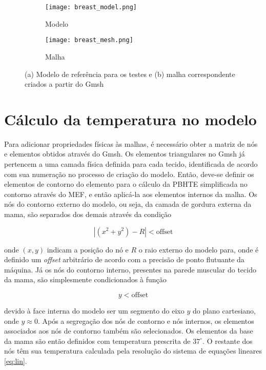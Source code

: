 \begin{figure}[!ht]
\centering
    \begin{subfigure}[b]{0.9\textwidth}
    \centering
    \texttt{[image: breast\_model.png]}
    \caption{Modelo}
    \end{subfigure}
    
    \begin{subfigure}[b]{0.9\textwidth}
    \centering
    \texttt{[image: breast\_mesh.png]}
    \caption{Malha}
    \end{subfigure}
    \caption{(a) Modelo de referência para os testes e (b) malha correspondente criados a partir do Gmsh}\label{fig:model}
\end{figure}

\section{Cálculo da temperatura no modelo}
Para adicionar propriedades físicas às malhas, é necessário obter a matriz de nós e elementos obtidos através do Gmsh. Os elementos triangulares no Gmsh já pertencem a uma camada física definida para cada tecido, identificada de acordo com sua numeração no processo de criação do modelo. Então, deve-se definir os elementos de contorno do elemento para o cálculo da PBHTE simplificada no contorno através do MEF, e então aplicá-la aos elementos internos da malha. Os nós do contorno externo do modelo, ou seja, da camada de gordura externa da mama, são separados dos demais através da condição

\begin{equation}
|(x^2 + y^2) - R| < \textrm{offset}
\end{equation}

\noindent onde $(x, y)$ indicam a posição do nó e $R$ o raio externo do modelo para, onde é definido um \textit{offset} arbitrário de acordo com a precisão de ponto flutuante da máquina. Já os nós do contorno interno, presentes na parede muscular do tecido da mama, são simplesmente condicionados à função

\begin{equation}
y < \textrm{offset}
\end{equation}

\noindent devido à face interna do modelo ser um segmento do eixo $y$ do plano cartesiano, onde $y \approx 0$. Após a segregação dos nós de contorno e nós internos, os elementos associados aos nós de contorno também são selecionados. Os elementos da base da mama são então definidos com temperatura prescrita de $37^\circ$. O restante dos nós têm sua temperatura calculada pela resolução do sistema de equações lineares \ref{eq:lin}.








